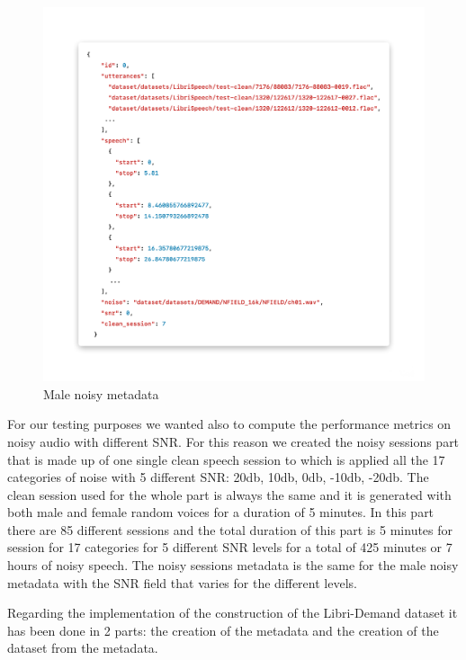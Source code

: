 \documentclass[../main.tex]{subfiles}
\begin{document}
\begin{figure}[ht]
    \centering
    \includegraphics[width=\textwidth]{images/session_noisy.png}
    \caption{Male noisy metadata}
    \label{fig:session_noisy}
\end{figure}

For our testing purposes we wanted also to compute the performance metrics on noisy audio with different SNR. For this reason we created the noisy sessions part that is made up of one single clean speech session to which is applied all the 17 categories of noise with 5 different SNR: 20db, 10db, 0db, -10db, -20db. The clean session used for the whole part is always the same and it is generated with both male and female random voices for a duration of 5 minutes. In this part there are 85 different sessions and the total duration of this part is 5 minutes for session for 17 categories for 5 different SNR levels for a total of 425 minutes or 7 hours of noisy speech. The noisy sessions metadata is the same for the male noisy metadata with the SNR field that varies for the different levels.

Regarding the implementation of the construction of the Libri-Demand dataset it has been done in 2 parts: the creation of the metadata and the creation of the dataset from the metadata. 
\end{document}
